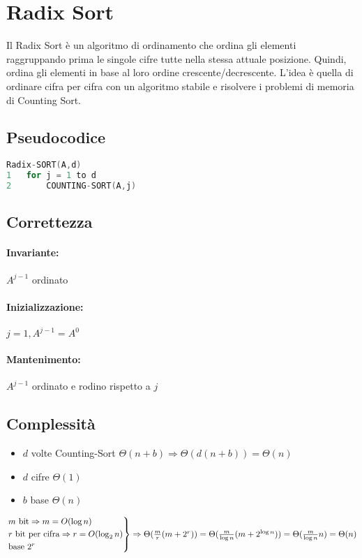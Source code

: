 \section{Radix Sort}
Il Radix Sort è un algoritmo di ordinamento che ordina gli elementi raggruppando prima le singole cifre tutte nella stessa attuale posizione. Quindi, ordina gli elementi in base al loro ordine crescente/decrescente. L'idea è quella di ordinare cifra per cifra con un algoritmo stabile e risolvere i problemi di memoria di Counting Sort.

\subsection{Pseudocodice}
\begin{mdframed}
\begin{lstlisting}[language=C]
Radix-SORT(A,d)
1   for j = 1 to d
2       COUNTING-SORT(A,j)
\end{lstlisting}
\end{mdframed}

\subsection{Correttezza}
\paragraph{Invariante:} $A^{j-1}$ ordinato
\paragraph{Inizializzazione:} $j=1, A^{j-1} = A^0$
\paragraph{Mantenimento:} $A^{j-1}$ ordinato e rodino rispetto a $j$

\subsection{Complessità}
\begin{itemize}
    \item $d$ volte Counting-Sort $\Theta(n+b) \Rightarrow \Theta(d(n+b)) = \Theta(n)$
    \item $d$ cifre $\Theta(1)$
    \item $b$ base $\Theta(n)$
\end{itemize}
$\begin{rcases}
    m \text{ bit} \Rightarrow m = O(\log n) \\
    r \text{ bit per cifra} \Rightarrow r = O(\log_2 n) \\
    \text{base } 2^r
\end{rcases}
\Rightarrow \Theta(\frac{m}{r}(m+2^r)) = \Theta(\frac{m}{\log n}(m+2^{\log n})) = \Theta(\frac{m}{\log n}n) = \Theta(n)$

\newpage